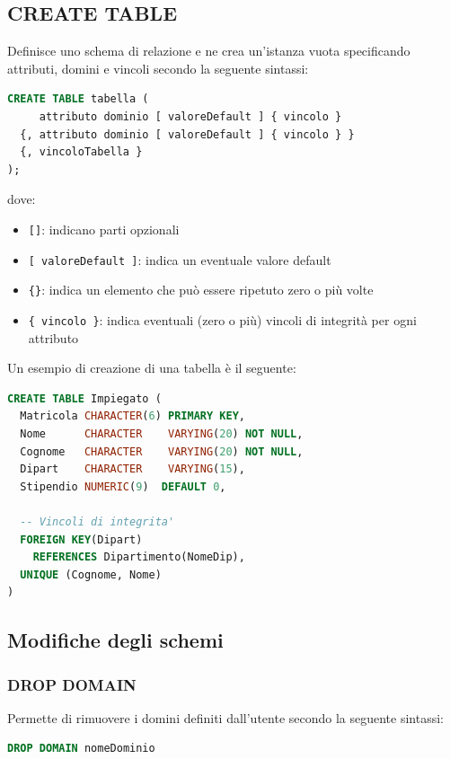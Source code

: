 \documentclass[a4paper,twoside]{article}
\begin{document}
\subsection{CREATE TABLE}
Definisce uno schema di relazione e ne crea un'istanza vuota specificando attributi,
domini e vincoli secondo la seguente sintassi:
\begin{lstlisting}[language=SQL]
CREATE TABLE tabella (
     attributo dominio [ valoreDefault ] { vincolo }
  {, attributo dominio [ valoreDefault ] { vincolo } }
  {, vincoloTabella }
);
\end{lstlisting}
dove:
\begin{itemize}
  \item \texttt{[]}: indicano parti opzionali
  \item \texttt{[ valoreDefault ]}: indica un eventuale valore default
  \item \texttt{\{\}}: indica un elemento che può essere ripetuto zero o più volte
  \item \texttt{\{ vincolo \}}: indica eventuali (zero o più) vincoli di integrità per
    ogni attributo
\end{itemize}

\begin{example}
  Un esempio di creazione di una tabella è il seguente:
\begin{lstlisting}[language=SQL]
CREATE TABLE Impiegato (
  Matricola CHARACTER(6) PRIMARY KEY,
  Nome      CHARACTER    VARYING(20) NOT NULL,
  Cognome   CHARACTER    VARYING(20) NOT NULL,
  Dipart    CHARACTER    VARYING(15),
  Stipendio NUMERIC(9)  DEFAULT 0,

  -- Vincoli di integrita'
  FOREIGN KEY(Dipart)
    REFERENCES Dipartimento(NomeDip), 
  UNIQUE (Cognome, Nome)
)
\end{lstlisting}
\end{example}

\subsection{Modifiche degli schemi}
\subsubsection{DROP DOMAIN}
Permette di rimuovere i domini definiti dall'utente secondo la seguente sintassi:
\begin{lstlisting}[language=SQL, numbers=none]
DROP DOMAIN nomeDominio
\end{lstlisting}
\end{document}
